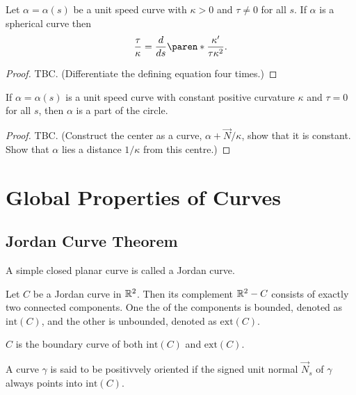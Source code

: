 \documentclass[11pt]{penrose}
\newcommand{\vN}{\vec{N}}
\renewcommand{\interior}[1]{\mathrm{int}(#1)}
\newcommand{\exterior}[1]{\mathrm{ext}(#1)}
\newcommand{\keyword}[1]{\textsf{#1}}
\begin{document}
\begin{nthm}
    Let $\alpha = \alpha(s)$ be a unit speed curve with $\kappa > 0$ and $\tau \neq 0$ for all $s$. If $\alpha$ is a spherical curve then
    \begin{equation}
        \frac{\tau}{\kappa} = \frac{d}{ds}\paren*{\frac{\kappa'}{\tau \kappa^2}}.
    \end{equation}
\end{nthm}
\begin{proof}
    TBC. (Differentiate the defining equation four times.)
\end{proof}

\begin{nthm}
    If $\alpha = \alpha(s)$ is a unit speed curve with constant positive curvature $\kappa$ and $\tau = 0$ for all $s$, then $\alpha$ is a part of the circle.
\end{nthm}
\begin{proof}
    TBC. (Construct the center as a curve, $\alpha + \vN/\kappa$, show that it is constant. Show that $\alpha$ lies a distance $1/\kappa$ from this centre.)
\end{proof}

\section{Global Properties of Curves}
\subsection{Jordan Curve Theorem}

\begin{ndfn}
    A simple closed planar curve is called a \keyword{Jordan curve}.
\end{ndfn}

\begin{nthm}
    Let $C$ be a Jordan curve in $\mathbb{R}^2$. Then its complement $\mathbb{R}^2 - C$ consists of exactly two connected components. One the of the components is bounded, denoted as $\interior{C}$, and the other is unbounded, denoted as $\exterior{C}$.
\end{nthm}

$C$ is the boundary curve of both $\interior{C}$ and $\exterior{C}$.

\begin{ndfn}
    A curve $\gamma$ is said to be positivvely oriented if the signed unit normal $\vN_s$ of $\gamma$ always points into $\interior{C}$.
\end{ndfn}
\end{document}
